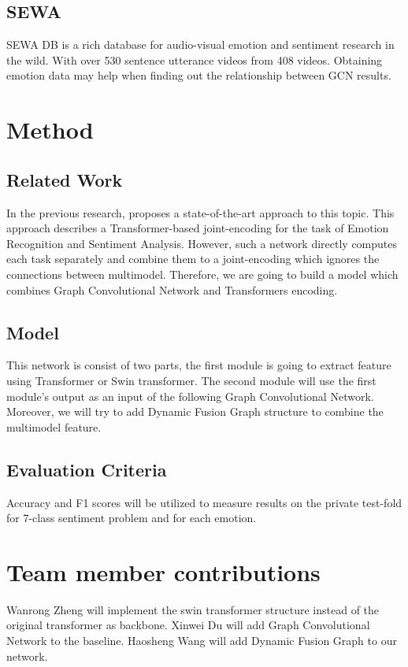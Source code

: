\documentclass[11pt]{article}
\begin{document}
\subsection{SEWA}
SEWA DB is a rich database for audio-visual emotion and sentiment research in the wild. With over 530 sentence utterance videos from 408 videos. Obtaining emotion data may help when finding out the relationship between GCN results.

\section{Method}
\subsection{Related Work}
In the previous research, \cite{DBLP:journals/corr/abs-2006-15955} proposes a state-of-the-art approach to this topic. This approach describes a Transformer-based\cite{DBLP:journals/corr/VaswaniSPUJGKP17} joint-encoding for the task of Emotion Recognition and Sentiment Analysis. 
However, such a network directly computes each task separately and combine them to a joint-encoding which ignores the connections between multimodel. Therefore, we are going to build a model which combines Graph Convolutional Network\cite{DBLP:journals/corr/KipfW16} and Transformers encoding.

\subsection{Model}
This network is consist of two parts, the first module is going to extract feature using Transformer or Swin transformer\cite{DBLP:journals/corr/abs-2103-14030}. The second module will use the first module's output as an input of the following Graph Convolutional Network. Moreover, we will try to add Dynamic Fusion Graph\cite{bagher-zadeh-etal-2018-multimodal} structure to combine the multimodel feature.

\subsection{Evaluation Criteria}
Accuracy and F1 scores will be utilized to measure results on the private test-fold for 7-class sentiment problem and for each emotion.
\section{Team member contributions}
Wanrong Zheng will implement the swin transformer structure instead of the original transformer as backbone. Xinwei Du will add Graph Convolutional Network to the baseline. Haosheng Wang will add Dynamic Fusion Graph to our network.




\end{document}
